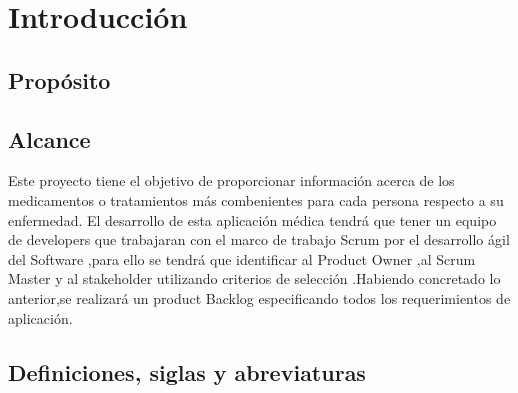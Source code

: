 \chapter{Introducción}

\section{Propósito}

\section{Alcance}
Este proyecto tiene el objetivo de proporcionar información acerca de los medicamentos o tratamientos más combenientes para cada persona respecto a su enfermedad.\newline
El desarrollo de esta aplicación médica tendrá que tener un equipo de developers que trabajaran con el marco de trabajo Scrum por el desarrollo ágil del Software ,para ello se tendrá que identificar al Product Owner ,al Scrum Master y al stakeholder utilizando criterios de selección .Habiendo concretado lo anterior,se realizará un product Backlog especificando todos los requerimientos de aplicación.

\section{Definiciones, siglas y abreviaturas}

